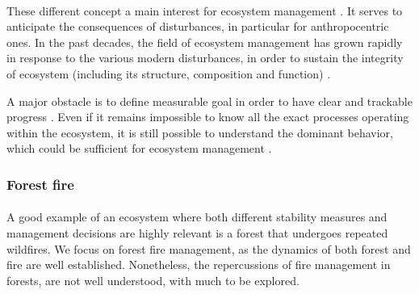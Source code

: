 \documentclass{article}
\begin{document}
\paragraph{}

These different concept a main interest for ecosystem management \citep{mumby_ecological_2014}. It serves to anticipate the consequences of disturbances, in particular for anthropocentric ones. In the past decades, the field of ecosystem management has grown rapidly \citep{grumbine_reflections_1997} in response to the various modern disturbances, in order to sustain the integrity of ecosystem (including its structure, composition and function) \citep{jensen1994overview}. 

A major obstacle is to define measurable goal in order to have clear and trackable progress \citep{slocombe_forum:_1998}.
Even if it remains impossible to know all the exact processes operating within the ecosystem, it is still possible to understand the dominant behavior, which could be sufficient for ecosystem management \citep{mori_ecosystem_2011, slocombe_forum:_1998, stanley_ecosystem_1995}.



\subsubsection*{Forest fire}

\paragraph{}
A good example of an ecosystem where both different stability measures and management decisions are highly relevant is a forest that undergoes repeated wildfires. %
We focus on forest fire management, as the dynamics of both forest and fire are well established. Nonetheless, the repercussions of fire management in forests, are not well understood, with much to be explored.


\paragraph{}
\end{document}
